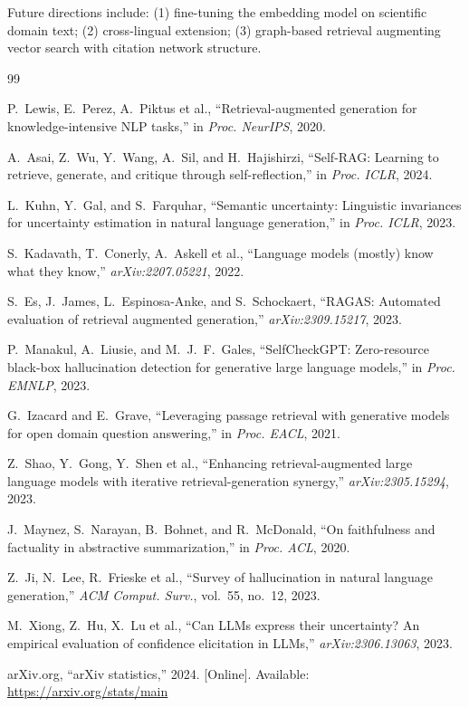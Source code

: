 \documentclass[conference]{IEEEtran}
\begin{document}
Future directions include: (1) fine-tuning the embedding model on scientific
domain text; (2) cross-lingual extension; (3) graph-based retrieval augmenting
vector search with citation network structure.


\begin{thebibliography}{99}

P.~Lewis, E.~Perez, A.~Piktus et al., ``Retrieval-augmented generation for
knowledge-intensive NLP tasks,'' in \textit{Proc. NeurIPS}, 2020.

A.~Asai, Z.~Wu, Y.~Wang, A.~Sil, and H.~Hajishirzi, ``Self-RAG: Learning to
retrieve, generate, and critique through self-reflection,'' in
\textit{Proc. ICLR}, 2024.

L.~Kuhn, Y.~Gal, and S.~Farquhar, ``Semantic uncertainty: Linguistic
invariances for uncertainty estimation in natural language generation,'' in
\textit{Proc. ICLR}, 2023.

S.~Kadavath, T.~Conerly, A.~Askell et al., ``Language models (mostly) know
what they know,'' \textit{arXiv:2207.05221}, 2022.

S.~Es, J.~James, L.~Espinosa-Anke, and S.~Schockaert, ``RAGAS: Automated
evaluation of retrieval augmented generation,'' \textit{arXiv:2309.15217},
2023.

P.~Manakul, A.~Liusie, and M.~J.~F.~Gales, ``SelfCheckGPT: Zero-resource
black-box hallucination detection for generative large language models,'' in
\textit{Proc. EMNLP}, 2023.

G.~Izacard and E.~Grave, ``Leveraging passage retrieval with generative models
for open domain question answering,'' in \textit{Proc. EACL}, 2021.

Z.~Shao, Y.~Gong, Y.~Shen et al., ``Enhancing retrieval-augmented large
language models with iterative retrieval-generation synergy,''
\textit{arXiv:2305.15294}, 2023.

J.~Maynez, S.~Narayan, B.~Bohnet, and R.~McDonald, ``On faithfulness and
factuality in abstractive summarization,'' in \textit{Proc. ACL}, 2020.

Z.~Ji, N.~Lee, R.~Frieske et al., ``Survey of hallucination in natural
language generation,'' \textit{ACM Comput. Surv.}, vol.~55, no.~12, 2023.

M.~Xiong, Z.~Hu, X.~Lu et al., ``Can LLMs express their uncertainty? An
empirical evaluation of confidence elicitation in LLMs,''
\textit{arXiv:2306.13063}, 2023.

arXiv.org, ``arXiv statistics,'' 2024. [Online]. Available:
\url{https://arxiv.org/stats/main}

\end{thebibliography}
\end{document}
